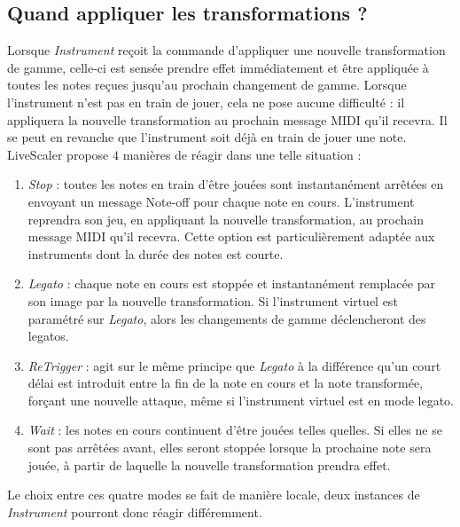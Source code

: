 \subsection{Quand appliquer les transformations ? }
Lorsque \emph{Instrument} reçoit la commande d'appliquer une nouvelle transformation de gamme, celle-ci est sensée prendre effet immédiatement et être appliquée à toutes les notes reçues jusqu'au prochain changement de gamme. Lorsque l'instrument n'est pas en train de jouer, cela ne pose aucune difficulté : il appliquera la nouvelle transformation au prochain message MIDI qu'il recevra. Il se peut en revanche que l'instrument soit déjà en train de jouer une note. LiveScaler propose $4$ manières de réagir dans une telle situation : 


\begin{enumerate}
  \item \emph{Stop} : toutes les notes en train d'être jouées sont instantanément arrêtées en envoyant un message Note-off pour chaque note en cours. L'instrument reprendra son jeu, en appliquant la nouvelle transformation, au prochain message MIDI qu'il recevra. Cette option est particulièrement adaptée aux instruments dont la durée des notes est courte. 
  \item \emph{Legato} : chaque note en cours est stoppée et instantanément remplacée par son image par la nouvelle transformation. Si l'instrument virtuel est paramétré sur \emph{Legato}, alors les changements de gamme déclencheront des legatos.
  \item \emph{ReTrigger} : agit sur le même principe que \emph{Legato} à la différence  qu'un court délai est introduit entre la fin de la note en cours et la note transformée, forçant une nouvelle attaque, même si l'instrument virtuel est en mode legato.
  \item \emph{Wait} : les notes en cours continuent d'être jouées telles quelles. Si elles ne se sont pas arrêtées avant, elles seront stoppée lorsque la prochaine note sera jouée, à partir de laquelle la nouvelle transformation prendra effet.
\end{enumerate}

Le choix entre ces quatre modes se fait de manière locale, deux instances de \emph{Instrument} pourront donc réagir différemment.
